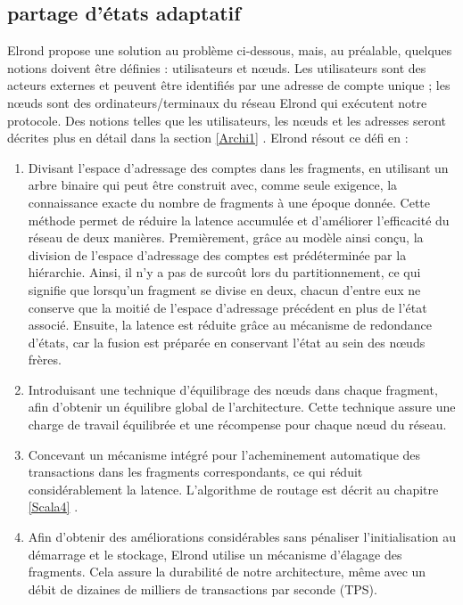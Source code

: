 \documentclass[journal]{IEEEtran}
\begin{document}
\subsection{partage d'états adaptatif}
Elrond propose une solution au problème ci-dessous, mais, au préalable, quelques notions doivent être définies : utilisateurs et nœuds. Les utilisateurs sont des acteurs externes et peuvent être identifiés par une adresse de compte unique ; les nœuds sont des ordinateurs/terminaux du réseau Elrond qui exécutent notre protocole. Des notions telles que les utilisateurs, les nœuds et les adresses seront décrites plus en détail dans la section  \ref{Archi1} .
Elrond résout ce défi en :
\begin{enumerate}
  \item Divisant l'espace d'adressage des comptes dans les fragments, en utilisant un arbre binaire qui peut être construit avec, comme  seule exigence, la connaissance exacte du nombre de fragments à une époque donnée. Cette méthode permet de réduire la latence accumulée et d'améliorer l'efficacité du réseau de deux manières. Premièrement, grâce au modèle ainsi conçu, la division de l'espace d'adressage des comptes est prédéterminée par la hiérarchie. Ainsi, il n'y a pas de surcoût lors du partitionnement, ce qui signifie que lorsqu’un fragment se divise en deux,  chacun d’entre eux ne conserve que la moitié de l'espace d'adressage précédent en plus de l'état associé. Ensuite, la latence est réduite grâce au mécanisme de redondance d'états, car la fusion est préparée en conservant l'état au sein des nœuds frères. 
  \item  Introduisant une technique d'équilibrage des nœuds dans chaque fragment, afin d'obtenir un équilibre global de l'architecture. Cette technique assure une charge de travail équilibrée et une récompense pour chaque nœud du réseau.
  \item Concevant un mécanisme intégré pour l'acheminement automatique des transactions dans les fragments correspondants, ce qui réduit considérablement la latence. L'algorithme de routage est décrit au chapitre \ref{Scala4}  .
  \item Afin d'obtenir des améliorations considérables sans pénaliser l'initialisation au démarrage et le stockage, Elrond utilise un mécanisme d'élagage des fragments. Cela assure la durabilité de notre architecture, même avec un débit de dizaines de milliers de transactions par seconde (TPS).
\end{enumerate}
\end{document}
